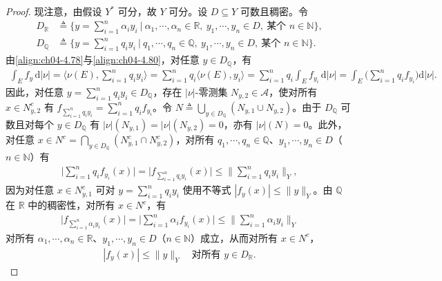 \documentclass[../../main.tex]{subfiles}%
\begin{document}
\begin{proof}
现注意，由假设 $Y^*$ 可分，故 $Y$ 可分。设 $D\subseteq Y$ 可数且稠密。令
\begin{align*}
D_{\mathbb R}&\triangleq \Big\{y=\sum_{i=1}^n\alpha_i y_i\ \Big|\ \alpha_1,\cdots ,\alpha_n\in\mathbb{R},\ y_1,\cdots ,y_n\in D,\ \text{某个 }n\in\mathbb{N}\Big\},\\
D_{\mathbb Q}&\triangleq \Big\{y=\sum_{i=1}^n q_i y_i\ \Big|\ q_1,\cdots ,q_n\in\mathbb{Q},\ y_1,\cdots ,y_n\in D,\ \text{某个 }n\in\mathbb{N}\Big\}.
\end{align*}
由\eqref{align:ch04-4.78}与\eqref{align:ch04-4.80}，对任意 $y\in D_{\mathbb Q}$，有
\begin{align*}
\int_E f_y\,\mathrm{d}|\nu|=\Big\langle\nu(E),\sum_{i=1}^n q_i y_i\Big\rangle=\sum_{i=1}^n q_i\langle\nu(E),y_i\rangle
=\sum_{i=1}^n q_i\int_E f_{y_i}\,\mathrm{d}|\nu|=\int_E\Big(\sum_{i=1}^n q_i f_{y_i}\Big)\mathrm{d}|\nu|.
\end{align*}
因此，对任意 $y=\sum_{i=1}^n q_i y_i\in D_{\mathbb Q}$，存在 $|\nu|$-零测集 $N_{y,2}\in\mathcal{A}$，使对所有 $x\in N_{y,2}^c$ 有 $f_{\sum_{i=1}^n q_i y_i}=\sum_{i=1}^n q_i f_{y_i}$。令 $N\triangleq \bigcup_{y\in D_{\mathbb Q}}(N_{y,1}\cup N_{y,2})$。由于 $D_{\mathbb Q}$ 可数且对每个 $y\in D_{\mathbb Q}$ 有 $|\nu|(N_{y,1})=|\nu|(N_{y,2})=0$，亦有 $|\nu|(N)=0$。此外，对任意 $x\in N^c=\bigcap_{y\in D_{\mathbb Q}}(N_{y,1}^c\cap N_{y,2}^c)$，对所有 $q_1,\cdots ,q_n\in\mathbb{Q}$、$y_1,\cdots ,y_n\in D$（$n\in\mathbb{N}$）有
\begin{align*}
\Big|\sum_{i=1}^n q_i f_{y_i}(x)\Big|=\Big|f_{\sum_{i=1}^n q_i y_i}(x)\Big|\leqslant\Big\|\sum_{i=1}^n q_i y_i\Big\|_Y,
\end{align*}
因为对任意 $x\in N_{y,1}^c$ 可对 $y=\sum_{i=1}^n q_i y_i$ 使用不等式 $|f_y(x)|\leqslant\|y\|_Y$。由 $\mathbb{Q}$ 在 $\mathbb{R}$ 中的稠密性，对所有 $x\in N^c$，有
\begin{align*}
\Big|f_{\sum_{i=1}^n\alpha_i y_i}(x)\Big|=\Big|\sum_{i=1}^n\alpha_i f_{y_i}(x)\Big|\leqslant\Big\|\sum_{i=1}^n\alpha_i y_i\Big\|_Y
\end{align*}
对所有 $\alpha_1,\cdots ,\alpha_n\in\mathbb{R}$、$y_1,\cdots ,y_n\in D$（$n\in\mathbb{N}$）成立，从而对所有 $x\in N^c$，
\begin{align}
|f_y(x)|\leqslant\|y\|_Y\quad\text{对所有 }y\in D_{\mathbb R}. \label{align:ch04-4.81}
\end{align}


\end{proof}
\end{document}
